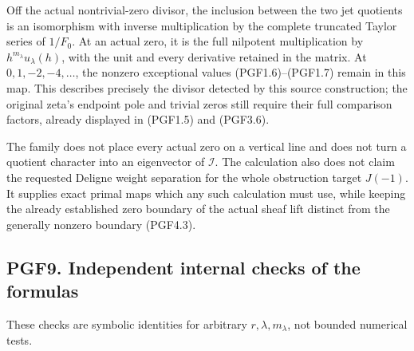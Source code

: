 Off the actual nontrivial-zero divisor, the inclusion between the two
jet quotients is an isomorphism with inverse multiplication by the
complete truncated Taylor series of \(1/F_0\). At an actual zero, it is
the full nilpotent multiplication by \(h^{m_\lambda}u_\lambda(h)\), with
the unit and every derivative retained in the matrix. At
\(0,1,-2,-4,\ldots\), the nonzero exceptional values (PGF1.6)--(PGF1.7)
remain in this map. This describes precisely the divisor detected by
this source construction; the original zeta's endpoint pole and trivial
zeros still require their full comparison factors, already displayed in
(PGF1.5) and (PGF3.6).

The family does not place every actual zero on a vertical line and does
not turn a quotient character into an eigenvector of \(\mathcal I\). The
calculation also does not claim the requested Deligne weight separation
for the whole obstruction target \(J(-1)\). It supplies exact primal
maps which any such calculation must use, while keeping the already
established zero boundary of the actual sheaf lift distinct from the
generally nonzero boundary (PGF4.3).

\subsection{PGF9. Independent internal checks of the
formulas}\label{pgf9.-independent-internal-checks-of-the-formulas}

These checks are symbolic identities for arbitrary
\(r,\lambda,m_\lambda\), not bounded numerical tests.

